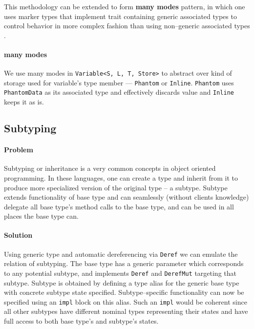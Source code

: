 This methodology can be extended to form \textbf{many modes} pattern, in which one uses marker types that implement trait 
containing generic associated types to control behavior in more complex fashion than using non--generic associated types \cite{nikobloggats}.

\paragraph{many modes}

We use many modes in \texttt{Variable<S, L, T, Store>} to abstract over kind of storage used for variable's type member --- \texttt{Phantom} or \texttt{Inline}.
\texttt{Phantom} uses \texttt{PhantomData} as its associated type and effectively discards value and \texttt{Inline} keeps it as is.

\subsection{Subtyping}

\paragraph{Problem}

Subtyping or inheritance is a very common concepts in object oriented programming. 
In these languages, one can create a type and inherit from it to produce more specialized version of the original type -- a subtype.
Subtype extends functionality of base type and can seamlessly (without clients knowledge) delegate all base type's method calls to the base type, and can be used in all places the base type can.

\paragraph{Solution}

Using generic type and automatic dereferencing via \texttt{Deref} we can emulate the relation of subtyping.
The base type has a generic parameter which corresponds to any potential subtype, and implements \texttt{Deref} and \texttt{DerefMut} targeting that subtype.
Subtype is obtained by defining a type alias for the generic base type with concrete subtype state specified.
Subtype--specific functionality can now be specified using an \texttt{impl} block on this alias. 
Such an \texttt{impl} would be coherent since all other subtypes have different nominal types representing their states and have full access to both base type's and subtype's states.

